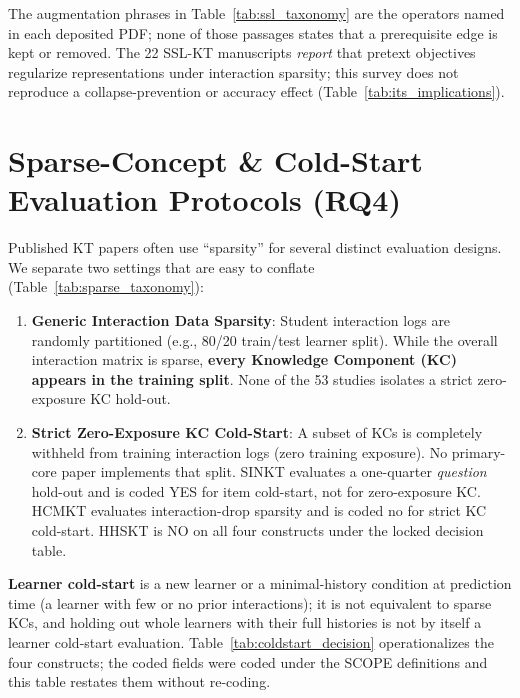 \documentclass[lettersize,journal]{IEEEtran}
\begin{document}
The augmentation phrases in Table~\ref{tab:ssl_taxonomy} are the operators named in each deposited PDF; none of those passages states that a prerequisite edge is kept or removed. The 22 SSL-KT manuscripts \emph{report} that pretext objectives regularize representations under interaction sparsity; this survey does not reproduce a collapse-prevention or accuracy effect (Table~\ref{tab:its_implications}).

\section{Sparse-Concept \& Cold-Start Evaluation Protocols (RQ4)}
\label{sec:sparse_coldstart}
Published KT papers often use ``sparsity'' for several distinct evaluation designs. We separate two settings that are easy to conflate (Table~\ref{tab:sparse_taxonomy}):
\begin{enumerate}
    \item \textbf{Generic Interaction Data Sparsity}: Student interaction logs are randomly partitioned (e.g., 80/20 train/test learner split). While the overall interaction matrix is sparse, \textbf{every Knowledge Component (KC) appears in the training split}. None of the 53 studies isolates a strict zero-exposure KC hold-out.
    \item \textbf{Strict Zero-Exposure KC Cold-Start}: A subset of KCs is completely withheld from training interaction logs (zero training exposure). No primary-core paper implements that split. SINKT \cite{KT044_SINKT_2024} evaluates a one-quarter \emph{question} hold-out and is coded YES for item cold-start, not for zero-exposure KC. HCMKT \cite{HCMKT_2026} evaluates interaction-drop sparsity and is coded no for strict KC cold-start. HHSKT is NO on all four constructs under the locked decision table.
\end{enumerate}
\textbf{Learner cold-start} is a new learner or a minimal-history condition at prediction time (a learner with few or no prior interactions); it is not equivalent to sparse KCs, and holding out whole learners with their full histories is not by itself a learner cold-start evaluation. Table~\ref{tab:coldstart_decision} operationalizes the four constructs; the coded fields were coded under the SCOPE definitions and this table restates them without re-coding.
\end{document}
